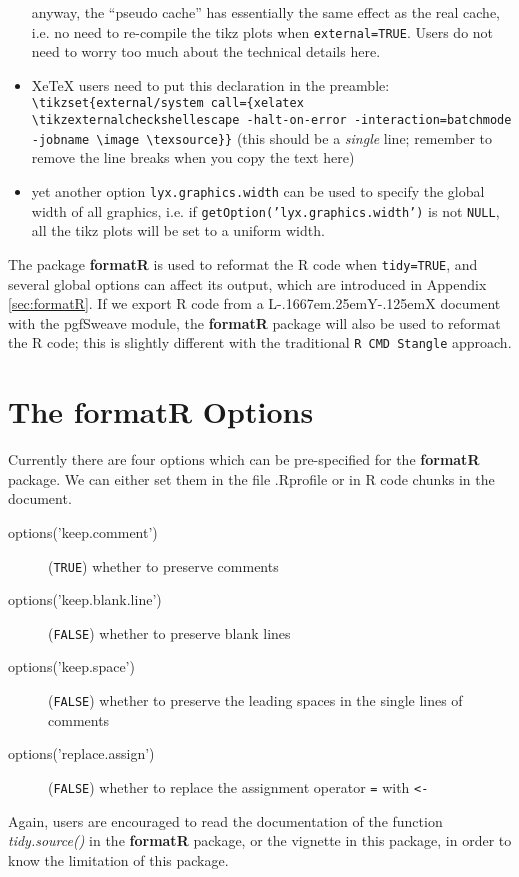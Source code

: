 \documentclass[english,noae,nogin]{article}
\makeatletter
\providecommand{\LyX}{\texorpdfstring%
  {L\kern-.1667em\lower.25em\hbox{Y}\kern-.125emX\@}
  {LyX}}
\makeatother
\begin{document}
\begin{itemize}
anyway, the ``pseudo cache'' has essentially the same effect as
the real cache, i.e. no need to re-compile the tikz plots when \texttt{external=TRUE}.
Users do not need to worry too much about the technical details here.

\item Xe\TeX{} users need to put this declaration in the preamble: \texttt{\textbackslash{}tikzset\{external/system
call=\{xelatex \textbackslash{}tikzexternalcheckshellescape -halt-on-error
-interaction=batchmode -jobname \textquotedbl{}\textbackslash{}image\textquotedbl{}
\textquotedbl{}\textbackslash{}texsource\textquotedbl{}\}\}} (this
should be a \emph{single} line; remember to remove the line breaks
when you copy the text here)
\item yet another option \texttt{lyx.graphics.width} can be used to specify
the global width of all graphics, i.e. if \texttt{getOption('lyx.graphics.width')}
is not \texttt{NULL}, all the tikz plots will be set to a uniform
width.
\end{itemize}
The package \textbf{formatR} is used to reformat the R code when \texttt{tidy=TRUE},
and several global options can affect its output, which are introduced
in Appendix \ref{sec:formatR}. If we export R code from a \LyX{}
document with the \textsf{pgfSweave} module, the \textbf{formatR}
package will also be used to reformat the R code; this is slightly
different with the traditional \texttt{R CMD Stangle} approach.

\appendix

\section{The formatR Options\label{sec:formatR}}

Currently there are four options which can be pre-specified for the
\textbf{formatR} package. We can either set them in the file \textsf{.Rprofile}
or in R code chunks in the document.
\begin{description}
\item [{options('keep.comment')}] (\texttt{TRUE}) whether to preserve comments
\item [{options('keep.blank.line')}] (\texttt{FALSE}) whether to preserve
blank lines
\item [{options('keep.space')}] (\texttt{FALSE}) whether to preserve the
leading spaces in the single lines of comments
\item [{options('replace.assign')}] (\texttt{FALSE}) whether to replace
the assignment operator \texttt{=} with \texttt{<-}
\end{description}
Again, users are encouraged to read the documentation of the function
\emph{tidy.source()} in the \textbf{formatR} package, or the vignette
in this package, in order to know the limitation of this package.
\end{document}
